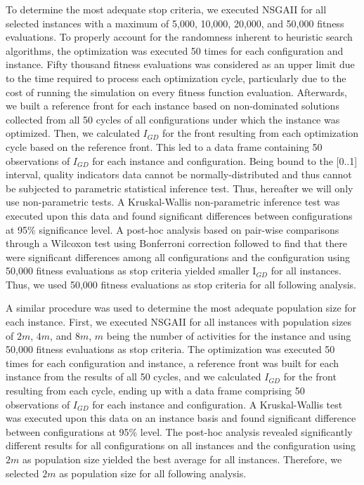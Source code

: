 \documentclass[conference]{IEEEtran}
\begin{document}
To determine the most adequate stop criteria, we executed NSGAII for all selected instances with a maximum of 5,000, 10,000, 20,000, and 50,000 fitness evaluations. To properly account for the randomness inherent to heuristic search algorithms, the optimization was executed 50 times for each configuration and instance. Fifty thousand fitness evaluations was considered as an upper limit due to the time required to process each optimization cycle, particularly due to the cost of running the simulation on every fitness function evaluation. Afterwards, we built a reference front for each instance based on non-dominated solutions collected from all 50 cycles of all configurations under which the instance was optimized. Then, we calculated $I_{GD}$ for the front resulting from each optimization cycle based on the reference front. This led to a data frame containing 50 observations of $I_{GD}$ for each instance and configuration. Being bound to the [0..1] interval, quality indicators data cannot be normally-distributed and thus cannot be subjected to parametric statistical inference test. Thus, hereafter we will only use non-parametric tests. A Kruskal-Wallis non-parametric inference test was executed upon this data and found significant differences between configurations at 95\% significance level. A post-hoc analysis based on pair-wise comparisons through a Wilcoxon test using Bonferroni correction followed to find that there were significant differences among all configurations and the configuration using 50,000 fitness evaluations as stop criteria yielded smaller I$_{GD}$ for all instances. Thus, we used 50,000 fitness evaluations as stop criteria for all following analysis.

A similar procedure was used to determine the most adequate population size for each instance. First, we executed NSGAII for all instances with population sizes of $2m$, $4m$, and $8m$, $m$ being the number of activities for the instance and using 50,000 fitness evaluations as stop criteria. The optimization was executed 50 times for each configuration and instance, a reference front was built for each instance from the results of all 50 cycles, and we calculated $I_{GD}$ for the front resulting from each cycle, ending up with a data frame comprising 50 observations of $I_{GD}$ for each instance and configuration. A Kruskal-Wallis test was executed upon this data on an instance basis and found significant difference between configurations at 95\% level. The post-hoc analysis revealed significantly different results for all configurations on all instances and the configuration using $2m$ as population size yielded the best average for all instances. Therefore, we selected $2m$ as population size for all following analysis.
\end{document}
